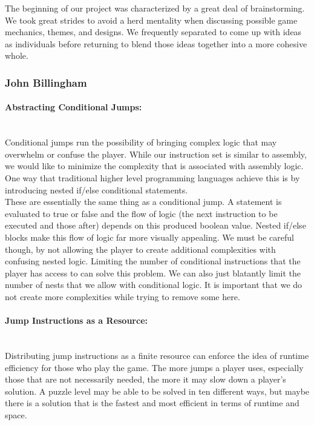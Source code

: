 The beginning of our project was characterized by a great deal of brainstorming. We took great strides
to avoid a herd mentality when discussing possible game mechanics, themes, and designs. We frequently
separated to come up with ideas as individuals before returning to blend those ideas together into a more
cohesive whole.

\subsubsection{John Billingham}
\paragraph{Abstracting Conditional Jumps:} ~\\
Conditional jumps run the possibility of bringing complex logic that may overwhelm
or confuse the player. While our instruction set is similar to assembly, we would like
to minimize the complexity that is associated with assembly logic. One way that traditional
higher level programming languages achieve this is by introducing nested if/else conditional
statements.\\

These are essentially the same thing as a conditional jump. A statement is evaluated to
true or false and the flow of logic (the next instruction to be executed and those after)
depends on this produced boolean value. Nested if/else blocks make this flow of logic
far more visually appealing. We must be careful though, by not allowing the player to create
additional complexities with confusing nested logic. Limiting the number of conditional
instructions that the player has access to can solve this problem. We can also just blatantly
limit the number of nests that we allow with conditional logic. It is important that we
do not create more complexities while trying to remove some here.\\

\paragraph{Jump Instructions as a Resource:} ~\\
Distributing jump instructions as a finite resource can enforce the idea of runtime
efficiency for those who play the game. The more jumps a player uses, especially those
that are not necessarily needed, the more it may slow down a player's solution. A puzzle level may
be able to be solved in ten different ways, but maybe there is a solution that is the fastest
and most efficient in terms of runtime and space.\\

